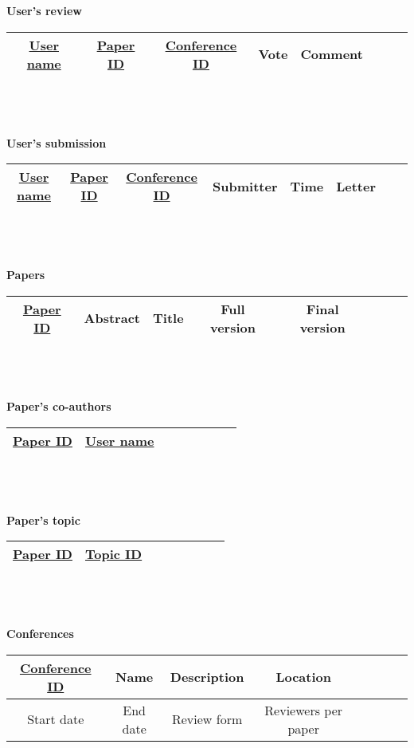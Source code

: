 \documentclass[12pt]{article}
\newcommand{\<}{\langle}
\renewcommand{\>}{\rangle}
\begin{document}
~\\
~\\
\textbf{User's review}\\
\begin{tabular}{|c|c|c|c|c|c|c|c|}
\hline 
\underline{User name}&
\underline{Paper ID}&
\underline{Conference ID}&
Vote & Comment\\
\hline 
\end{tabular}
~\\
~\\
~\\
\textbf{User's submission}\\
\begin{tabular}{|c|c|c|c|c|c|c|c|}
\hline 
\underline{User name}&
\underline{Paper ID}&
\underline{Conference ID}&
Submitter & Time & Letter\\
\hline 
\end{tabular}
~\\
~\\
~\\
\textbf{Papers}\\
\begin{tabular}{|c|c|c|c|c|c|c|c|}
\hline 
\underline{Paper ID} & Abstract & Title & Full version & Final version\\ 
\hline 
\end{tabular}
~\\
~\\
~\\
\textbf{Paper's co-authors}\\
\begin{tabular}{|c|c|c|c|c|c|c|c|}
\hline 
\underline{Paper ID} & \underline{User name}\\ 
\hline 
\end{tabular}
~\\
~\\
~\\
\textbf{Paper's topic}\\
\begin{tabular}{|c|c|c|c|c|c|c|c|}
\hline 
\underline{Paper ID} & \underline{Topic ID}\\
\hline 
\end{tabular}
~\\
~\\
~\\
\textbf{Conferences}\\
\begin{tabular}{|c|c|c|c|c|c|c|c|}
\hline 
\underline{Conference ID} & Name & Description & Location\\ 
\hline 
Start date & End date & Review form & Reviewers per paper\\
\hline 
\end{tabular}
\end{document}
